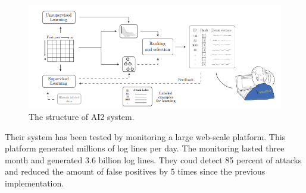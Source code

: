 \begin{figure}[H]
\centering
\includegraphics[width=1\textwidth]{Figures/AI2}
\decoRule
\caption[The structure of AI2 system]{The structure of AI2 system. \cite{mit2}}
\label{fig:mit}
\end{figure}

\noindent Their system has been tested by monitoring a large web-scale platform. This platform generated millions of log lines per day. The monitoring lasted three month and generated 3.6 billion log lines. They coud detect 85 percent of attacks and reduced the amount of false positives by 5 times since the previous implementation. \cite{mit2}

